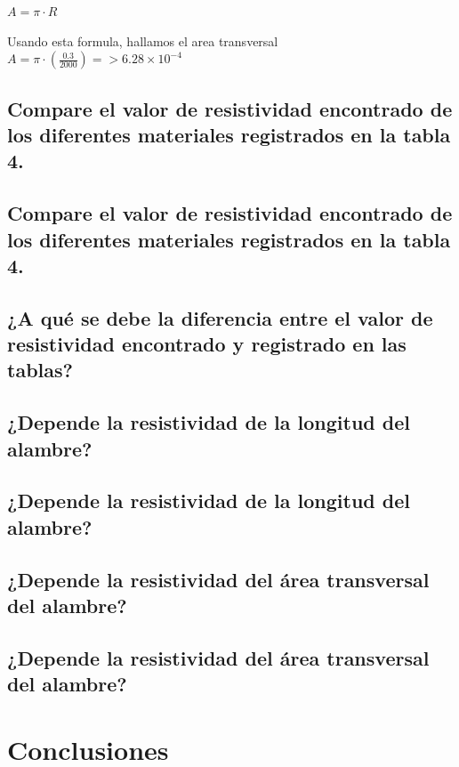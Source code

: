 \documentclass[letterpaper, 12pt]{article}
\begin{document}
$A = \pi \cdot R$

Usando esta formula, hallamos el area transversal
$A = \pi \cdot (\frac{0.3}{2000}) => 6.28 \times 10^{-4}$

\subsection*{Compare el valor de resistividad encontrado de los diferentes materiales
	registrados en la tabla 4.}

\subsection*{Compare el valor de resistividad encontrado de los diferentes materiales
	registrados en la tabla 4.}

\subsection*{¿A qué se debe la diferencia entre el valor de resistividad encontrado y registrado
	en las tablas?}
	
\subsection*{¿Depende la resistividad de la longitud del alambre?}

\subsection*{¿Depende la resistividad de la longitud del alambre?}

\subsection*{¿Depende la resistividad del área transversal del alambre?}

\subsection*{¿Depende la resistividad del área transversal del alambre?}



























\section{Conclusiones}

\newpage


\end{document}
